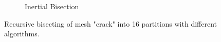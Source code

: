 \begin{figure}[H]
\begin{subfigure}{0.5\textwidth}
		\caption{Inertial Bisection}
		\label{fig:inert_crack}
	\end{subfigure}
	\caption{Recursive bisecting of mesh "crack" into 16 partitions with different algorithms.}
	\label{fig:rec_bi}
\end{figure}

